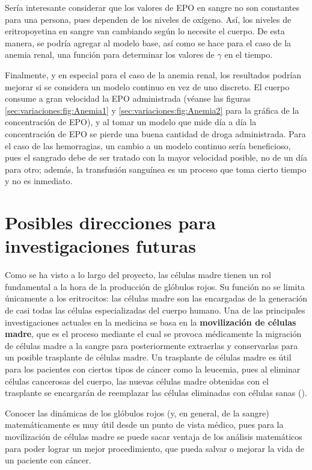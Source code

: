 Sería interesante considerar que los valores de EPO en sangre no son constantes para una persona, pues dependen de los niveles de oxígeno. Así, los niveles de eritropoyetina en sangre van cambiando según lo necesite el cuerpo. De esta manera, se podría agregar al modelo base, así como se hace para el caso de la anemia renal, una función para determinar los valores de $\gamma$ en el tiempo.

Finalmente, y en especial para el caso de la anemia renal, los resultados podrían mejorar si se considera un modelo continuo en vez de uno discreto. El cuerpo consume a gran velocidad la EPO administrada (véanse las figuras \ref{sec:variaciones:fig:Anemia1} y \ref{sec:variaciones:fig:Anemia2} para la gráfica de la concentración de EPO), y al tomar un modelo que mide día a día la concentración de EPO se pierde una buena cantidad de droga administrada. Para el caso de las hemorragias, un cambio a un modelo continuo sería beneficioso, pues el sangrado debe de ser tratado con la mayor velocidad posible, no de un día para otro; además, la transfusión sanguínea es un proceso que toma cierto tiempo y no es inmediato. 

\section{Posibles direcciones para investigaciones futuras}

Como se ha visto a lo largo del proyecto, las células madre tienen un rol fundamental a la hora de la producción de glóbulos rojos. Su función no se limita únicamente a los eritrocitos: las células madre son las encargadas de la generación de casi todas las células especializadas del cuerpo humano. Una de las principales investigaciones actuales en la medicina se basa en la \textbf{movilización de células madre}, que es el proceso mediante el cual se provoca médicamente la migración de células madre a la sangre para posteriormente extraerlas y conservarlas para un posible trasplante de células madre. Un trasplante de células madre es útil para los pacientes con ciertos tipos de cáncer como la leucemia, pues al eliminar células cancerosas del cuerpo, las nuevas células madre obtenidas con el trasplante se encargarán de reemplazar las células eliminadas con células sanas (\cite{Trasplante}).  

Conocer las dinámicas de los glóbulos rojos (y, en general, de la sangre) matemáticamente es muy útil desde un punto de vista médico, pues para la movilización de células madre se puede sacar ventaja de los análisis matemáticos para poder lograr un mejor procedimiento, que pueda salvar o mejorar la vida de un paciente con cáncer.
